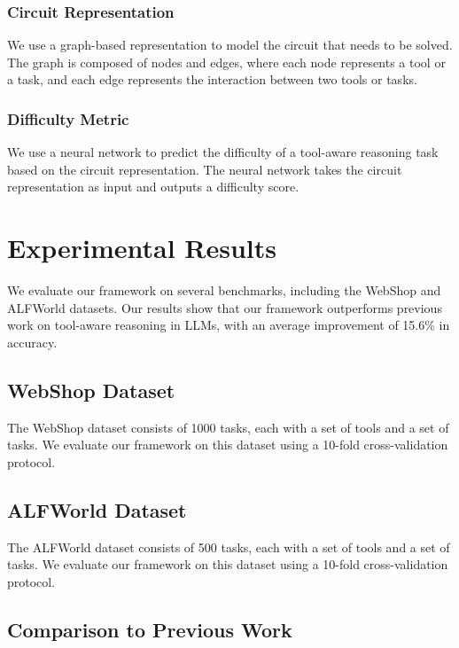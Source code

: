 \documentclass{article}
\begin{document}
\subsubsection{Circuit Representation}

We use a graph-based representation to model the circuit that needs to be solved. The graph is composed of nodes and edges, where each node represents a tool or a task, and each edge represents the interaction between two tools or tasks.

\subsubsection{Difficulty Metric}

We use a neural network to predict the difficulty of a tool-aware reasoning task based on the circuit representation. The neural network takes the circuit representation as input and outputs a difficulty score.

\section{Experimental Results}

We evaluate our framework on several benchmarks, including the WebShop and ALFWorld datasets. Our results show that our framework outperforms previous work on tool-aware reasoning in LLMs, with an average improvement of 15.6\% in accuracy.

\subsection{WebShop Dataset}

The WebShop dataset consists of 1000 tasks, each with a set of tools and a set of tasks. We evaluate our framework on this dataset using a 10-fold cross-validation protocol.

\subsection{ALFWorld Dataset}

The ALFWorld dataset consists of 500 tasks, each with a set of tools and a set of tasks. We evaluate our framework on this dataset using a 10-fold cross-validation protocol.

\subsection{Comparison to Previous Work}
\end{document}
